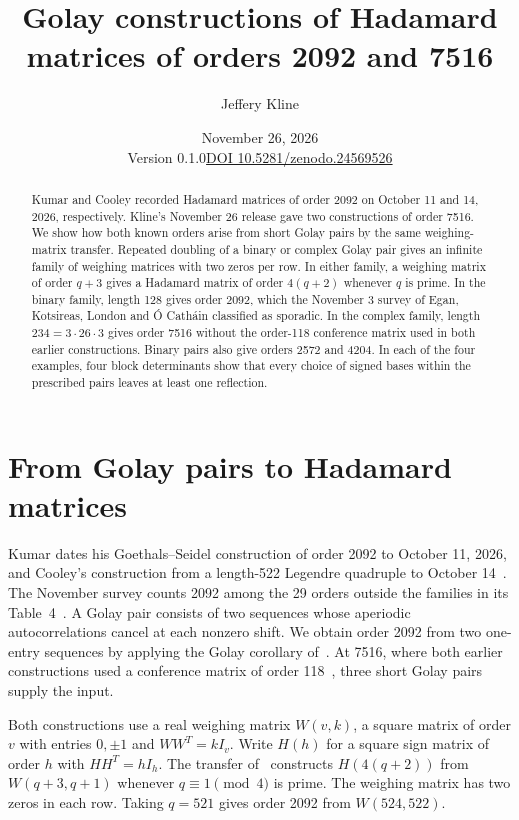 \documentclass[10pt]{article}
\title{Golay constructions of Hadamard matrices of orders 2092 and 7516}
\author{Jeffery Kline}
\date{November 26, 2026\\[2pt]\small Version 0.1.0\quad\href{https://doi.org/10.5281/zenodo.24569526}{DOI 10.5281/zenodo.24569526}}
\begin{document}
\maketitle
\begin{abstract}
Kumar and Cooley recorded Hadamard matrices of order 2092 on October 11 and 14, 2026, respectively. Kline's November 26 release gave two constructions of order 7516. We show how both known orders arise from short Golay pairs by the same weighing-matrix transfer. Repeated doubling of a binary or complex Golay pair gives an infinite family of weighing matrices with two zeros per row. In either family, a weighing matrix of order $q+3$ gives a Hadamard matrix of order $4(q+2)$ whenever $q$ is prime. In the binary family, length 128 gives order 2092, which the November 3 survey of Egan, Kotsireas, London and \'O Cath\'ain classified as sporadic. In the complex family, length $234=3\cdot26\cdot3$ gives order 7516 without the order-118 conference matrix used in both earlier constructions. Binary pairs also give orders 2572 and 4204. In each of the four examples, four block determinants show that every choice of signed bases within the prescribed pairs leaves at least one reflection.
\end{abstract}

\section*{From Golay pairs to Hadamard matrices}
Kumar dates his Goethals--Seidel construction of order 2092 to October 11, 2026, and Cooley's construction from a length-522 Legendre quadruple to October 14~\cite{kumar,cooley}. The November survey counts 2092 among the 29 orders outside the families in its Table~4~\cite[Section~4]{survey}. A Golay pair consists of two sequences whose aperiodic autocorrelations cancel at each nonzero shift. We obtain order 2092 from two one-entry sequences by applying the Golay corollary of~\cite{kline}. At 7516, where both earlier constructions used a conference matrix of order 118~\cite{first7516}, three short Golay pairs supply the input.

Both constructions use a real weighing matrix $W(v,k)$, a square matrix of order $v$ with entries $0,\pm1$ and $WW^T=kI_v$. Write $H(h)$ for a square sign matrix of order $h$ with $HH^T=hI_h$. The transfer of~\cite{kline} constructs $H(4(q+2))$ from $W(q+3,q+1)$ whenever $q\equiv1\pmod4$ is prime. The weighing matrix has two zeros in each row. Taking $q=521$ gives order 2092 from $W(524,522)$.
\end{document}
